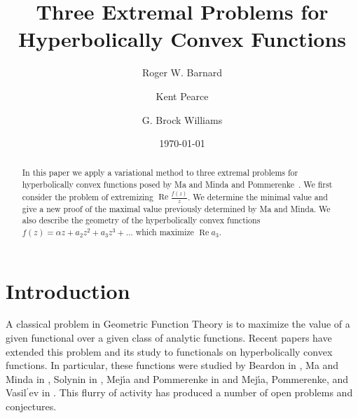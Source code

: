 \documentclass{cmft}
\title{Three Extremal Problems for Hyperbolically Convex Functions}
\newcommand{\al}{\alpha}
\DeclareMathOperator{\re}{Re}
\begin{document}
\author{Roger W. Barnard } 

\address{Department of Mathematics and Statistics,
Texas Tech University, Lubbock, TX 79409} 

\author{Kent Pearce } 

\address{Department of Mathematics and Statistics, Texas
Tech University, Lubbock, TX 79409} 

\author{G. Brock Williams } 

\address{Department of Mathematics and Statistics, Texas
Tech University, Lubbock, TX 79409} 


\date{\today}



\maketitle

\begin{abstract}
In this paper we apply a variational method
 to three extremal problems for hyperbolically convex
functions posed by Ma and Minda and Pommerenke~\cite{MM94,pomm1}.   
We first consider the problem of extremizing $\re
\frac{f (z)}{z}$.  We determine the minimal value and
give a new proof of the  maximal value previously determined by
Ma and Minda.  We also describe the geometry of the hyperbolically
convex  functions $f(z)=\al z+a_2 z^2 + a_3 z^3+\dots$
which maximize $\re a_3$.

\end{abstract}


\pagestyle{myheadings} \thispagestyle{plain} 

\section{Introduction}
 

A classical problem in Geometric Function Theory is to maximize the value of a
given functional over a given class of analytic functions.  Recent papers have
extended this problem and its study to functionals on hyperbolically convex
functions.  In particular, these functions were studied by Beardon in
\cite{aB83}, Ma and Minda in \cite{MM94,MM99}, Solynin in \cite{aS98,aS99},
Mej{\'{\i}}a and Pommerenke in
\cite{PM00,MP00b,MP01,MP02,MP00} and Mej{\'{\i}}a, Pommerenke, and Vasil$^\prime$ev
 in \cite{MPV01}.  This flurry of activity has produced
a number of open problems and conjectures.
\end{document}
